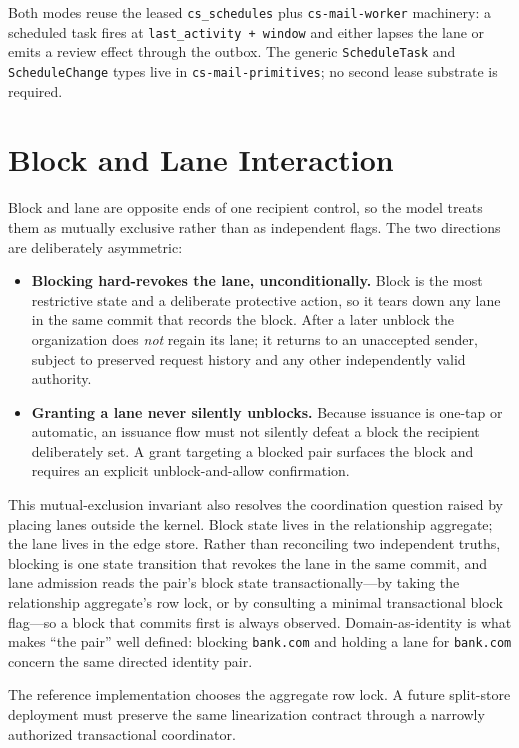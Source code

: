 \documentclass[11pt]{article}
\begin{document}
Both modes reuse the leased \texttt{cs\_schedules} plus \texttt{cs-mail-worker}
machinery: a scheduled task fires at \texttt{last\_activity + window} and either
lapses the lane or emits a review effect through the outbox. The generic
\texttt{ScheduleTask} and \texttt{ScheduleChange} types live in
\texttt{cs-mail-primitives}; no second lease substrate is required.

\section{Block and Lane Interaction}

Block and lane are opposite ends of one recipient control, so the model treats
them as mutually exclusive rather than as independent flags. The two directions
are deliberately asymmetric:

\begin{itemize}[leftmargin=2em]
    \item \textbf{Blocking hard-revokes the lane, unconditionally.} Block is the
    most restrictive state and a deliberate protective action, so it tears down
    any lane in the same commit that records the block. After a later unblock the
    organization does \emph{not} regain its lane; it returns to an unaccepted sender,
    subject to preserved request history and any other independently valid authority.
    \item \textbf{Granting a lane never silently unblocks.} Because issuance is
    one-tap or automatic, an issuance flow must not silently defeat a block the
    recipient deliberately set. A grant targeting a blocked pair surfaces the
    block and requires an explicit unblock-and-allow confirmation.
\end{itemize}

This mutual-exclusion invariant also resolves the coordination question raised by
placing lanes outside the kernel. Block state lives in the relationship aggregate;
the lane lives in the edge store. Rather than reconciling two independent truths,
blocking is one state transition that revokes the lane in the same commit, and
lane admission reads the pair's block state transactionally---by taking the
relationship aggregate's row lock, or by consulting a minimal transactional block
flag---so a block that commits first is always observed. Domain-as-identity is
what makes ``the pair'' well defined: blocking \texttt{bank.com} and holding a
lane for \texttt{bank.com} concern the same directed identity pair.

The reference implementation chooses the aggregate row lock. A future split-store
deployment must preserve the same linearization contract through a narrowly
authorized transactional coordinator.
\end{document}
